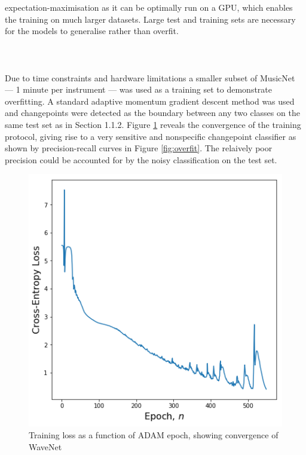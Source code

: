 \documentclass{article}[12pt]
\numberwithin{equation}{section}
\begin{document}
expectation-maximisation as it can be optimally run on a GPU, which enables the
training on much larger datasets. Large test and training sets are necessary
for the models to generalise rather than overfit.
\\\\
\\\\
Due to time constraints and hardware limitations a smaller subset of MusicNet ---
1 minute per instrument --- was used as a training set to demonstrate overfitting.
A standard adaptive momentum gradient descent method \cite{Kingma2014} was used
and changepoints were detected as the boundary between any two classes on the same
test set as in Section 1.1.2. Figure \ref{fig:backprop} reveals the convergence
of the training protocol, giving rise to a very sensitive and nonspecific
changepoint classifier as shown by precision-recall curves in Figure \ref{fig:overfit}.
The relaively poor precision could be accounted for by the noisy classification
on the test set.
\begin{figure}[H]
\centering{}
\captionsetup{justification=centering}
\includegraphics[scale=0.5]{backprop}
\caption{
Training loss as a function of ADAM epoch, showing convergence of WaveNet
}
\label{fig:backprop}
\end{figure}\noindent
\end{document}
